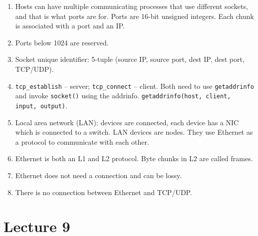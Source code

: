 \documentclass[12pt,a4paper]{article}
\begin{document}
\begin{enumerate}
  \item Hosts can have multiple communicating processes that use different sockets, and that is what ports are for. Ports are 16-bit unsigned integers. Each chunk is associated with a port and an IP.
  \item Ports below 1024 are reserved.
  \item Socket unique identifier: 5-tuple (source IP, source port, dest IP, dest port, TCP/UDP).
  \item \texttt{tcp\_establish} -- server; \texttt{tcp\_connect} -- client. Both need to use \texttt{getaddrinfo} and invoke \texttt{socket()} using the addrinfo. \texttt{getaddrinfo(host, client, input, output)}.
  \item Local area network (LAN): devices are connected, each device has a NIC which is connected to a switch. LAN devices are nodes. They use Ethernet as a protocol to communicate with each other.
  \item Ethernet is both an L1 and L2 protocol. Byte chunks in L2 are called frames.
  \item Ethernet does not need a connection and can be lossy.
  \item There is no connection between Ethernet and TCP/UDP.
\end{enumerate}

\section{Lecture 9}
\end{document}
